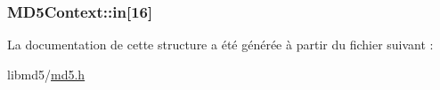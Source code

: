 \subsubsection[{in}]{ M\+D5\+Context\+::in\mbox{[}16\mbox{]}}\label{struct_m_d5_context_ac2d5f8af04d15c256eecb635bdaf52c3}


La documentation de cette structure a été générée à partir du fichier suivant \+:\begin{DoxyCompactItemize}
\item 
libmd5/\hyperlink{md5_8h}{md5.\+h}\end{DoxyCompactItemize}
